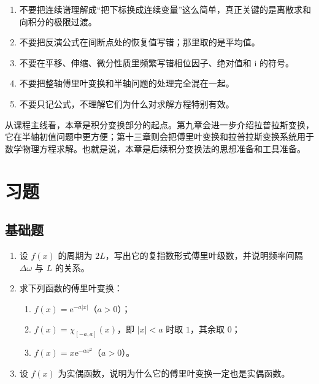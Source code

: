 \begin{jinshi}[本章最容易混淆的地方]
\begin{enumerate}
    \item 不要把连续谱理解成``把下标换成连续变量''这么简单，真正关键的是离散求和向积分的极限过渡。
    \item 不要把反演公式在间断点处的恢复值写错；那里取的是平均值。
    \item 不要在平移、伸缩、微分性质里频繁写错相位因子、绝对值和 $\mathrm{i}$ 的符号。
    \item 不要把整轴傅里叶变换和半轴问题的处理完全混在一起。
    \item 不要只记公式，不理解它们为什么对求解方程特别有效。
\end{enumerate}
\end{jinshi}

\begin{tishi}[和后续内容的联系]
从课程主线看，本章是积分变换部分的起点。第九章会进一步介绍拉普拉斯变换，它在半轴初值问题中更方便；第十三章则会把傅里叶变换和拉普拉斯变换系统用于数学物理方程求解。也就是说，本章是后续积分变换法的思想准备和工具准备。
\end{tishi}

\section{习题}

\subsection*{基础题}
\begin{enumerate}
    \item 设 $f(x)$ 的周期为 $2L$，写出它的复指数形式傅里叶级数，并说明频率间隔 $\Delta\omega$ 与 $L$ 的关系。
    \item 求下列函数的傅里叶变换：
    \begin{enumerate}
        \item $f(x)=\mathrm{e}^{-a|x|}$（$a>0$）；
        \item $f(x)=\chi_{[-a,a]}(x)$，即 $|x|<a$ 时取 $1$，其余取 $0$；
        \item $f(x)=x\mathrm{e}^{-ax^2}$（$a>0$）。
    \end{enumerate}
    \item 设 $f(x)$ 为实偶函数，说明为什么它的傅里叶变换一定也是实偶函数。
\end{enumerate}

